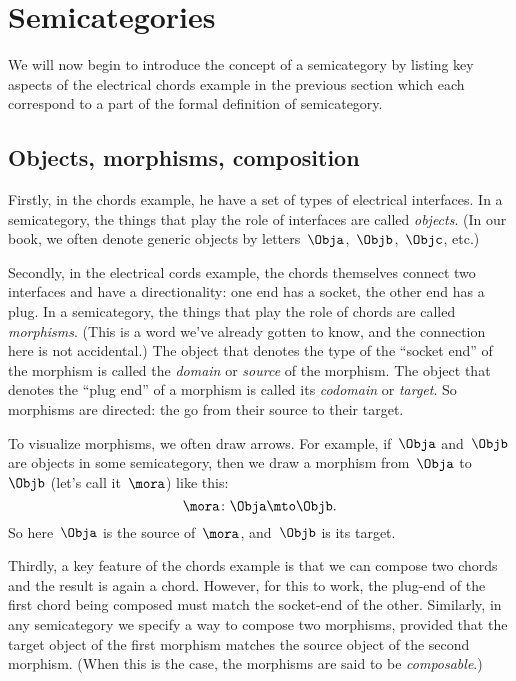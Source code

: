 
\section[Semicategories]{Semicategories}
\label{sec:formal-def-semicat}



We will now begin to introduce the concept of a semicategory by listing key aspects of the electrical chords example in the previous section which each correspond to a part of the formal definition of semicategory.

\subsection{Objects, morphisms, composition}

Firstly, in the chords example, he have a set of types of electrical interfaces.
In a semicategory, the things that play the role of interfaces are called \emph{objects}.
(In our book, we often denote generic objects by letters~$\Obja$,~$\Objb$,~$\Objc$, etc.)

Secondly, in the electrical cords example, the chords themselves connect two interfaces and have a directionality: one end has a socket, the other end has a plug.
In a semicategory, the things that play the role of chords are called \emph{morphisms}.
(This is a word we've already gotten to know, and the connection here is not accidental.) The object that denotes the type of the ``socket end'' of the morphism is called the \emph{domain} or \emph{source} of the morphism.
The object that denotes the ``plug end'' of a morphism is called its \emph{codomain} or \emph{target}.
So morphisms are directed: the go from their source to their target.

To visualize morphisms, we often draw arrows.
For example, if~$\Obja$ and~$\Objb$ are objects in some semicategory, then we draw a morphism from~$\Obja$ to~$\Objb$ (let's call it~$\mora$) like this:
\begin{equation}
	\mora\colon \Obja \mto \Objb.
\end{equation}
So here~$\Obja$ is the source of~$\mora$, and~$\Objb$ is its target.

Thirdly, a key feature of the chords example is that we can compose two chords and the result is again a chord.
However, for this to work, the plug-end of the first chord being composed must match the socket-end of the other.
Similarly, in any semicategory we specify a way to compose two morphisms, provided that the target object of the first morphism matches the source object of the second morphism.
(When this is the case, the morphisms are said to be \emph{composable}.)

